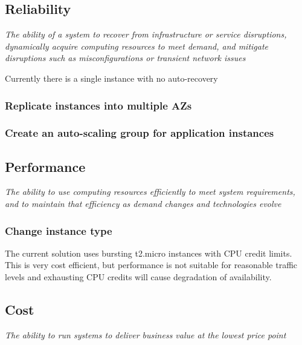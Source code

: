 \subsection{Reliability}

\textit{The ability of a system to recover from infrastructure or service disruptions, dynamically acquire computing resources to meet demand, and mitigate disruptions such as misconfigurations or transient network issues}

Currently there is a single instance with no auto-recovery

\subsubsection{Replicate instances into multiple AZs}

\subsubsection{Create an auto-scaling group for application instances}

\subsection{Performance}

\textit{The ability to use computing resources efficiently
	to meet system requirements, and to maintain that efficiency as demand changes and technologies evolve}

\subsubsection{Change instance type}

The current solution uses bursting t2.micro instances with CPU credit limits. This is very cost efficient, but performance is not suitable for reasonable traffic levels and exhausting CPU credits will cause degradation of availability.

\subsection{Cost} 

\textit{The ability to run systems to deliver business value at the lowest price point}





